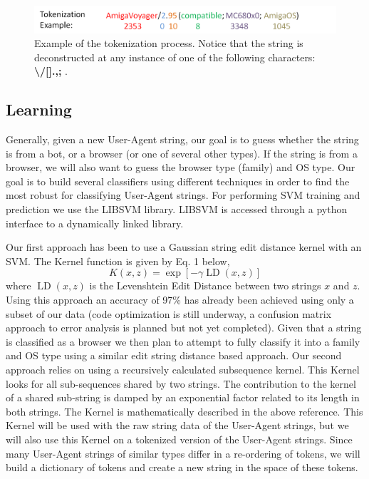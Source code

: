 \documentclass[10pt]{article}
\begin{document}
\begin{figure}
\includegraphics[width=6in]{token_figure.png}
\caption{Example of the tokenization process.  Notice that the string is deconstructed at any instance of one of the following characters: {\bf \textbackslash /[].,;}  .}
\end{figure}


\subsection{Learning}
Generally, given a new User-Agent string, our goal is to guess whether the string is from a bot, or a browser (or one of several other types).  If the string is from a browser, we will also want to guess the browser type (family) and OS type.    Our goal is to build several classifiers using different techniques in order to find the most robust for classifying User-Agent strings.  For performing SVM training and prediction we use the LIBSVM library.\cite{libsvm}  LIBSVM is accessed through a python interface to a dynamically linked library. 

Our first approach has been to use a Gaussian string edit distance kernel with an SVM.   The Kernel function is given by Eq. 1 below,
\begin{equation}
K(x,z) = \exp \left[ - \gamma \operatorname{LD} (x,z) \right]
\end{equation}
where $\operatorname{LD}(x,z)$ is the Levenshtein Edit Distance between two strings $x$ and $z$.  Using this approach an accuracy of 97\% has already been achieved using only a subset of our data (code optimization is still underway, a confusion matrix approach to error analysis is planned but not yet completed).   Given that a string is classified as a browser we then plan to attempt to fully classify it into a family and OS type using a similar edit string distance based approach.
Our second approach relies on using a recursively calculated subsequence kernel.\cite{subseqkernel}  This Kernel looks for all sub-sequences shared by two strings.  The contribution to the kernel of a shared sub-string is damped by an exponential factor related to its length in both strings.  The Kernel is mathematically described  in the above reference.  This Kernel will be used with the raw string data of the User-Agent strings, but we will also use this Kernel on a tokenized version of the User-Agent strings.  Since many User-Agent strings of similar types differ in a re-ordering of tokens, we will build a dictionary of tokens and create a new string in the space of these tokens.  
\end{document}
